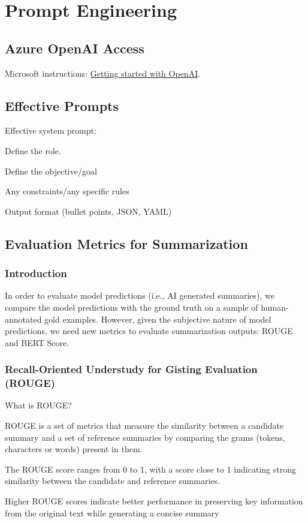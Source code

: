 \chapter{Prompt Engineering}

\section{Azure OpenAI Access}
Microsoft instructions: \href{https://learn.microsoft.com/en-us/training/modules/get-started-openai/1-introduction}{Getting started with OpenAI}.

\section{Effective Prompts}
Effective system prompt:
\begin{numberedlist}
	\item Define the role.
	\item Define the objective/goal
	\item Any constraints/any specific rules
	\item Output format (bullet points, JSON, YAML)
\end{numberedlist} 

\section{Evaluation Metrics for Summarization}
\subsection{Introduction}
In order to evaluate model predictions (i.e., AI generated summaries), we compare the model predictions with the ground truth on a sample of human-annotated gold examples. However, given the subjective nature of model predictions, we need new metrics to evaluate summarization outputs: ROUGE and BERT Score.

\subsection{Recall-Oriented Understudy for Gisting Evaluation (ROUGE)}
What is ROUGE?
\begin{bulletedlist}
	\item ROUGE is a set of metrics that measure the similarity between a candidate summary and a set of reference summaries by comparing the grams (tokens, characters or words) present in them.
	\item The ROUGE score ranges from 0 to 1, with a score close to 1 indicating strong similarity between the candidate and reference summaries.
	\item Higher ROUGE scores indicate better performance in preserving key information from the original text while generating a concise summary
\end{bulletedlist}


